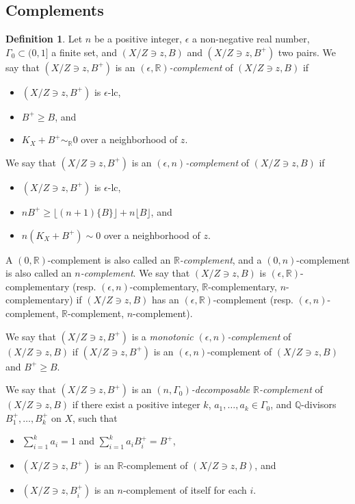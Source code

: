 \documentclass[11pt]{amsart}
\numberwithin{equation}{section}
\newcommand{\Qq}{\mathbb{Q}}
\newcommand{\Rr}{\mathbb{R}}
\newcommand{\Ii}{{\Gamma}}
\theoremstyle{definition}
\theoremstyle{definition}
\newtheorem{defn}[thm]{Definition}
\begin{document}
\subsection{Complements}\label{section: complements}
\begin{defn}\label{defn: complement}
Let $n$ be a positive integer, $\epsilon$ a non-negative real number, $\Ii_0\subset (0,1]$ a finite set, and $(X/Z\ni z,B)$ and $(X/Z\ni z,B^+)$ two pairs. We say that $(X/Z\ni z,B^+)$ is an \emph{$(\epsilon,\Rr)$-complement} of $(X/Z\ni z,B)$ if 
\begin{itemize}
    \item $(X/Z\ni z,B^+)$ is $\epsilon$-lc,
    \item $B^+\geq B$, and
    \item $K_X+B^+\sim_{\Rr}0$ over a neighborhood of $z$.
\end{itemize}
We say that $(X/Z\ni z,B^+)$ is an \emph{$(\epsilon,n)$-complement} of $(X/Z\ni z,B)$ if
\begin{itemize}
\item $(X/Z\ni z,B^+)$ is $\epsilon$-lc,
\item $nB^+\geq \lfloor (n+1)\{B\}\rfloor+n\lfloor B\rfloor$, and
\item $n(K_X+B^+)\sim 0$ over a neighborhood of $z$.
\end{itemize}
A $(0,\Rr)$-complement is also called an \emph{$\Rr$-complement}, and a $(0,n)$-complement is also called an \emph{$n$-complement}. We say that $(X/Z\ni z,B)$ is $(\epsilon,\Rr)$-complementary (resp. $(\epsilon,n)$-complementary, $\Rr$-complementary, $n$-complementary) if $(X/Z\ni z,B)$ has an $(\epsilon,\Rr)$-complement (resp. $(\epsilon,n)$-complement, $\Rr$-complement, $n$-complement). 

 We say that $(X/Z\ni z,B^+)$ is a \emph{monotonic $(\epsilon,n)$-complement} of $(X/Z\ni z,B)$ if $(X/Z\ni z,B^+)$ is an $(\epsilon,n)$-complement of $(X/Z\ni z,B)$ and $B^+\geq B$.%
 
 We say that $(X/Z\ni z,B^+)$ is an \emph{$(n,\Ii_0)$-decomposable $\Rr$-complement} of $(X/Z\ni z,B)$ if there exist a positive integer $k$, $a_1,\dots,a_k\in\Ii_0$, and  $\Qq$-divisors $B_1^+,\dots,B_k^+$ on $X$, such that
\begin{itemize}
\item $\sum_{i=1}^ka_i=1$ and  $\sum_{i=1}^ka_iB_i^+=B^+$,
\item $(X/Z\ni z,B^+)$ is an $\Rr$-complement of $(X/Z\ni z,B)$, and
\item  $(X/Z\ni z,B_i^+)$ is an $n$-complement of itself for each $i$.
\end{itemize}

\end{defn}
\end{document}
